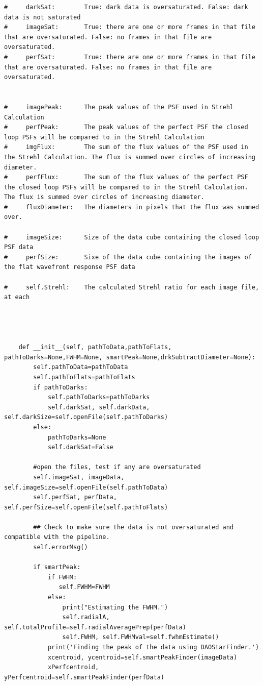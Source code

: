 \begin{lstlisting}
#     darkSat:        True: dark data is oversaturated. False: dark data is not saturated
#     imageSat:       True: there are one or more frames in that file that are oversaturated. False: no frames in that file are oversaturated.
#     perfSat:        True: there are one or more frames in that file that are oversaturated. False: no frames in that file are oversaturated. 


#     imagePeak:      The peak values of the PSF used in Strehl Calculation
#     perfPeak:       The peak values of the perfect PSF the closed loop PSFs will be compared to in the Strehl Calculation
#     imgFlux:        The sum of the flux values of the PSF used in the Strehl Calculation. The flux is summed over circles of increasing diameter. 
#     perfFlux:       The sum of the flux values of the perfect PSF the closed loop PSFs will be compared to in the Strehl Calculation. The flux is summed over circles of increasing diameter.
#     fluxDiameter:   The diameters in pixels that the flux was summed over.

#     imageSize:      Size of the data cube containing the closed loop PSF data
#     perfSize:       Sixe of the data cube containing the images of the flat wavefront response PSF data

#     self.Strehl:    The calculated Strehl ratio for each image file, at each 

        

    
    def __init__(self, pathToData,pathToFlats, pathToDarks=None,FWHM=None, smartPeak=None,drkSubtractDiameter=None):
        self.pathToData=pathToData
        self.pathToFlats=pathToFlats
        if pathToDarks:
            self.pathToDarks=pathToDarks
            self.darkSat, self.darkData, self.darkSize=self.openFile(self.pathToDarks)
        else:
            pathToDarks=None
            self.darkSat=False 
            
        #open the files, test if any are oversaturated  
        self.imageSat, imageData, self.imageSize=self.openFile(self.pathToData)
        self.perfSat, perfData, self.perfSize=self.openFile(self.pathToFlats)
            
        ## Check to make sure the data is not oversaturated and compatible with the pipeline. 
        self.errorMsg()
        
        if smartPeak:
            if FWHM:
               self.FWHM=FWHM 
            else:
                print("Estimating the FWHM.")
                self.radialA, self.totalProfile=self.radialAveragePrep(perfData)
                self.FWHM, self.FWHMval=self.fwhmEstimate()
            print('Finding the peak of the data using DAOStarFinder.')
            xcentroid, ycentroid=self.smartPeakFinder(imageData)
            xPerfcentroid, yPerfcentroid=self.smartPeakFinder(perfData)
                

\end{lstlisting}
